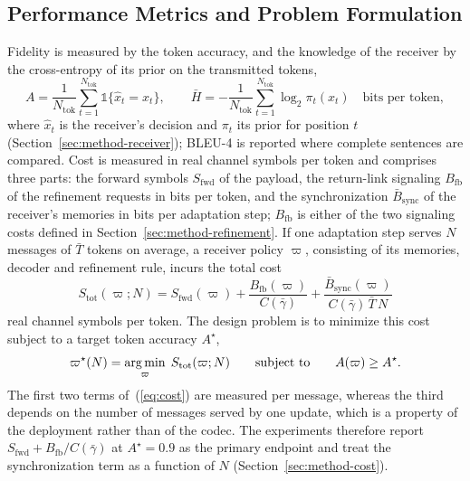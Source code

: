 \subsection{Performance Metrics and Problem Formulation}
\label{sec:system-problem}

Fidelity is measured by the token accuracy, and the knowledge of the receiver by the cross-entropy of its prior on the transmitted tokens,
\begin{equation}
A = \frac{1}{N_\mathrm{tok}}\sum_{t=1}^{N_\mathrm{tok}}\mathbb{1}\{\hat{x}_t = x_t\},\qquad
\bar{H} = -\frac{1}{N_\mathrm{tok}}\sum_{t=1}^{N_\mathrm{tok}}\log_2\pi_t(x_t)\quad\text{bits per token},
\label{eq:metrics}
\end{equation}
where $\hat{x}_t$ is the receiver's decision and $\pi_t$ its prior for position $t$ (Section~\ref{sec:method-receiver}); BLEU-4 \cite{papineni2002} is reported where complete sentences are compared. Cost is measured in real channel symbols per token and comprises three parts: the forward symbols $S_\mathrm{fwd}$ of the payload, the return-link signaling $B_\mathrm{fb}$ of the refinement requests in bits per token, and the synchronization $\bar{B}_\mathrm{sync}$ of the receiver's memories in bits per adaptation step; $B_\mathrm{fb}$ is either of the two signaling costs defined in Section~\ref{sec:method-refinement}. If one adaptation step serves $N$ messages of $\bar{T}$ tokens on average, a receiver policy $\varpi$, consisting of its memories, decoder and refinement rule, incurs the total cost
\begin{equation}
S_\mathrm{tot}(\varpi;N) = S_\mathrm{fwd}(\varpi) + \frac{B_\mathrm{fb}(\varpi)}{C(\bar{\gamma})} + \frac{\bar{B}_\mathrm{sync}(\varpi)}{C(\bar{\gamma})\,\bar{T}\,N}
\label{eq:cost}
\end{equation}
real channel symbols per token. The design problem is to minimize this cost subject to a target token accuracy $A^\star$,
\begin{equation}
\varpi^\star(N) = \operatorname*{arg\,min}_{\varpi}\; S_\mathrm{tot}(\varpi;N)\qquad\text{subject to}\qquad A(\varpi)\ge A^\star .
\label{eq:problem}
\end{equation}
The first two terms of~(\ref{eq:cost}) are measured per message, whereas the third depends on the number of messages served by one update, which is a property of the deployment rather than of the codec. The experiments therefore report $S_\mathrm{fwd}+B_\mathrm{fb}/C(\bar{\gamma})$ at $A^\star = 0.9$ as the primary endpoint and treat the synchronization term as a function of $N$ (Section~\ref{sec:method-cost}).
